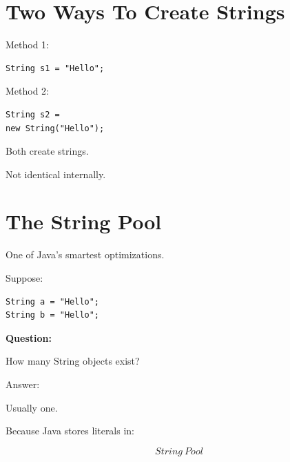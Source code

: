 \documentclass[11pt,a4paper]{book}
\begin{document}

\section{Two Ways To Create Strings}

Method 1:

\begin{verbatim}
String s1 = "Hello";
\end{verbatim}


Method 2:

\begin{verbatim}
String s2 =
new String("Hello");
\end{verbatim}


Both create strings.


Not identical internally.


\section{The String Pool}

One of Java's smartest optimizations.


Suppose:

\begin{verbatim}
String a = "Hello";
String b = "Hello";
\end{verbatim}


\textbf{Question:}

How many String objects exist?


Answer:

Usually one.


Because Java stores literals in:

\[
String\ Pool
\]
\end{document}
